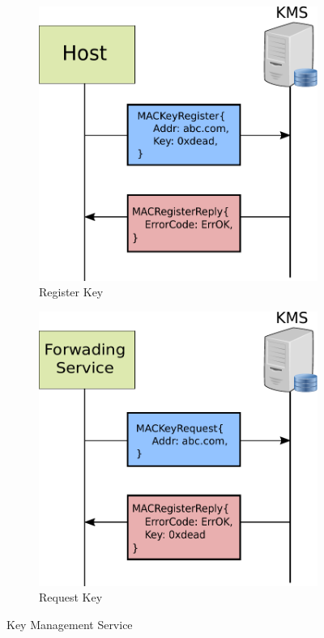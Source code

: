 \begin{figure}[th!]
\centering
\begin{subfigure}{.5\textwidth}
  \centering
  \includegraphics[width=0.95\linewidth]{Figures/kms.pdf}
  \caption[MAC Key Register]{Register Key}
  \label{fig:kms_register}
\end{subfigure}%
\begin{subfigure}{.5\textwidth}
  \centering
  \includegraphics[width=0.95\linewidth]{Figures/kms_request.pdf}
  \caption[MAC Key Request]{Request Key}
  \label{fig:kms_request}
\end{subfigure}
\caption{Key Management Service}
\label{fig:kms}
\end{figure}

